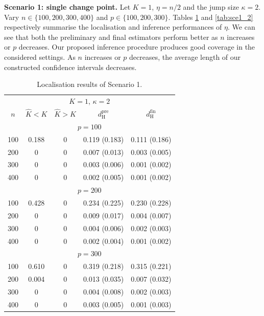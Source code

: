 \documentclass[11pt]{article}
\theoremstyle{plain}
\theoremstyle{definition}
\begin{document}
\medskip
\noindent \textbf{Scenario 1: single change point.} Let $K = 1$, $\eta = n/2$ and the jump size $\kappa = 2$.  Vary $n \in \{100, 200, 300, 400\}$ and $p \in \{100, 200, 300\}$. Tables \ref{tab:sce1_1} and \ref{tab:sce1_2} respectively summarise the localisation and inference performances of $\eta$. We can see that both the preliminary and final estimators perform better as $n$ increases or $p$ decreases. Our proposed inference procedure produces good coverage in the considered settings.  As $n$ increases or $p$ decreases, the average length of our constructed confidence intervals decreases.
\begin{table}[t]
\centering
\caption{Localisation results of Scenario 1. }
\begin{tabular}{ccccc}
\hline
\multicolumn{5}{c}{$K = 1$, $\kappa = 2$} \\ 
$n$   & $\widehat{K} < K$ & $\widehat{K} > K$ & $d_{\mathrm{H}}^{\mathrm{pre}}$ & $d_{\mathrm{H}}^{\mathrm{fin}}$ \\ \hline
\multicolumn{5}{c}{$p = 100$}                                                                             \\
100 & 0.188   & 0         & 0.119 (0.183)  & 0.111 (0.186)  \\
200 & 0       & 0     & 0.007 (0.013)  & 0.003 (0.005)   \\
300 & 0       & 0     & 0.003 (0.006)  & 0.001 (0.002)   \\
400 & 0       & 0     & 0.002 (0.005)  & 0.001 (0.002)   \\
\multicolumn{5}{c}{$p = 200$}                                                                             \\
100 & 0.428   & 0         & 0.234 (0.225)  & 0.230 (0.228)   \\
200 & 0       & 0     & 0.009 (0.017)  & 0.004 (0.007)   \\
300 & 0       & 0     & 0.004 (0.006)  & 0.002 (0.003)   \\
400 & 0       & 0     & 0.002 (0.004)  & 0.001 (0.002)   \\
\multicolumn{5}{c}{$p = 300$}                                                                             \\
100 & 0.610     & 0       & 0.319 (0.218)   & 0.315 (0.221)   \\
200 & 0.004     & 0       & 0.013 (0.035)  & 0.007 (0.032)   \\
300 & 0         & 0   & 0.004 (0.008)  & 0.002 (0.003)   \\
400 & 0         & 0   & 0.003 (0.005)  & 0.001 (0.003)   \\
\hline
\end{tabular}
\label{tab:sce1_1}
\end{table}
\end{document}
